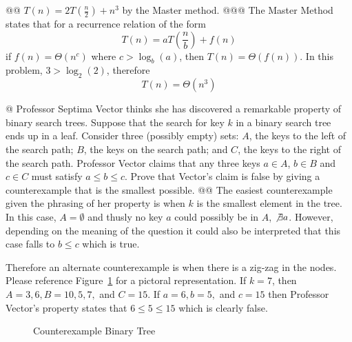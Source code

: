 \documentclass[10pt]{article}
\begin{document}
\begin{easylist}[enumerate]
    @@ $T(n) = 2T \left( \frac{n}{2} \right) + n^3$ by the Master method.
    @@@ The Master Method states that for a recurrence relation of the form
        \[ T(n) = a T\left( \frac{n}{b} \right) + f(n) \]
        if $f(n) = \Theta(n^c)$ where $c > \log_b(a)$, then $T(n) = \Theta(f(n))$. In this problem, $3 > \log_2(2)$, therefore 
        \[ \boxed{T(n) = \Theta(n^3)} \]

    \newpage
    @ Professor Septima Vector thinks she has discovered a remarkable property of binary search trees. Suppose that the search for key $k$ in a binary search tree ends up in a leaf. Consider three (possibly empty) sets: $A$, the keys to the left of the search path; $B$, the keys on the search path; and $C$, the keys to the right of the search path.  Professor Vector claims that any three keys $a \in A$, $b \in B$ and $c \in C$ must satisfy $ a \le b \le c$. Prove that Vector's claim is false by giving a counterexample that is the smallest possible.
    @@ The easiest counterexample given the phrasing of her property is when $k$ is the smallest element in the tree. In this case, $A = \emptyset$ and thusly no key $a$ could possibly be in $A$, $\not\exists a$. However, depending on the meaning of the question it could also be interpreted that this case falls to $b \le c$ which is true.

    Therefore an alternate counterexample is when there is a zig-zag in the nodes. Please reference Figure~\ref{fig:counter} for a pictoral representation. If $k = 7$, then $A = {3, 6}, B = {10, 5, 7},$ and $C = {15}$. If $ a = 6, b = 5,$ and $c=15$ then Professor Vector's property states that $ 6 \le 5 \le 15$ which is clearly false.

    \begin{figure}[ht]
        \centering
        \caption{Counterexample Binary Tree}
        \label{fig:counter}
    \end{figure}
\end{easylist}
\end{document}
